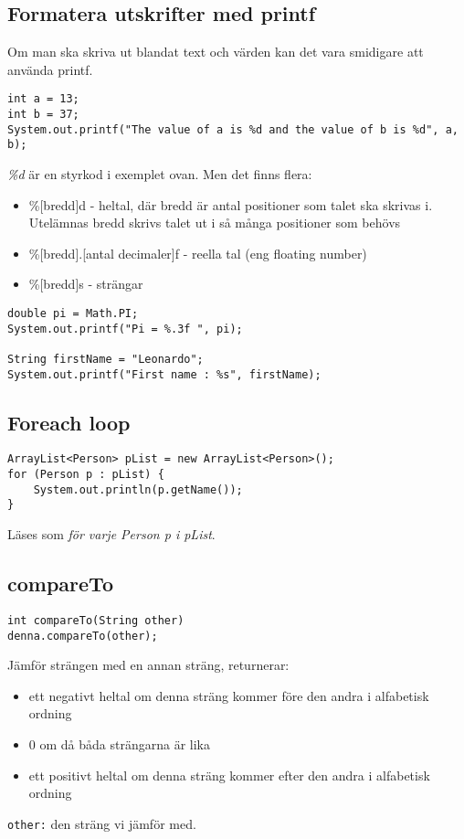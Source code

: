 \documentclass[11pt]{article}
\begin{document}
\subsection{Formatera utskrifter med printf}
Om man ska skriva ut blandat text och värden kan det vara smidigare att använda printf.
\begin{lstlisting}
int a = 13;
int b = 37;
System.out.printf("The value of a is %d and the value of b is %d", a, b);
\end{lstlisting}
\emph{\%d} är en styrkod i exemplet ovan.
Men det finns flera:
\begin{itemize}
\item{ \%[bredd]d - heltal, där bredd är antal positioner som talet ska skrivas i. Utelämnas bredd skrivs talet ut i så många positioner som behövs}
\item{ \%[bredd].[antal decimaler]f - reella tal (eng floating number)}
\item{ \%[bredd]s - strängar}
\end{itemize}
\begin{lstlisting}
double pi = Math.PI;
System.out.printf("Pi = %.3f ", pi);

String firstName = "Leonardo";
System.out.printf("First name : %s", firstName);
\end{lstlisting}
\subsection{Foreach loop}
\begin{lstlisting}
ArrayList<Person> pList = new ArrayList<Person>();
for (Person p : pList) {
	System.out.println(p.getName());
}
\end{lstlisting} 
Läses som \emph{för varje Person p i pList}.

\subsection{compareTo}
\begin{lstlisting}
int compareTo(String other)
denna.compareTo(other);
\end{lstlisting} 
Jämför strängen med en annan sträng, returnerar:
\begin{itemize}
\item{ett negativt heltal om denna sträng kommer före den andra i alfabetisk ordning}
\item{0 om då båda strängarna är lika}
\item{ett positivt heltal om denna sträng kommer efter den andra i alfabetisk ordning}
\end{itemize}
\verb+other:+ den sträng vi jämför med.
\end{document}
